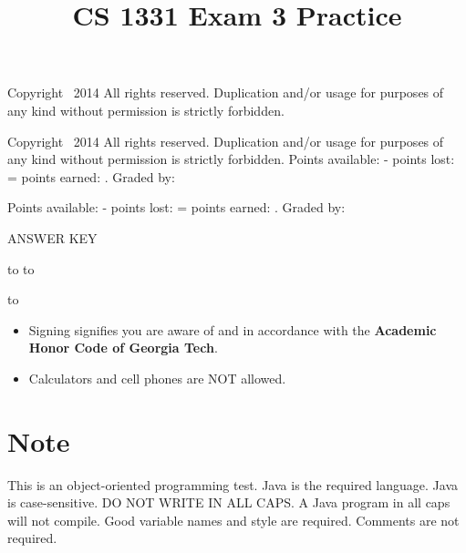 \documentclass[answers,addpoints,9pt]{exam}
\title{CS 1331 Exam 3 Practice}
\date{}
\begin{document}
\maketitle
\thispagestyle{head}
\firstpageheader{}
              {\tiny Copyright \textcopyright\ 2014 All rights reserved. Duplication and/or usage for purposes of any kind without permission is strictly forbidden.}
              {}

\runningheader{}
              {\tiny Copyright \textcopyright\ 2014 All rights reserved. Duplication and/or usage for purposes of any kind without permission is strictly forbidden.}
              {}
              {}
              {Points available: \pointsonpage{ \thepage} -
               points lost: \makebox[.5in]{\hrulefill} =
               points earned:  \makebox[.5in]{\hrulefill}.
              Graded by: \makebox[.75in]{\hrulefill}}

              {}
              {Points available: \pointsonpage{ \thepage} -
               points lost: \makebox[.5in]{\hrulefill} =
               points earned:  \makebox[.5in]{\hrulefill}.
              Graded by: \makebox[.75in]{\hrulefill}}

\ifprintanswers
\begin{center}
{\LARGE ANSWER KEY}
\end{center}
\else
\vspace{0.1in}
\hbox to \textwidth{Name (print clearly): \enspace\hrulefill}
\vspace{0.3in}
\hbox to \textwidth{Signature: \hrulefill}

\vspace{0.3in}
\hbox to \textwidth{GT account username (gtg, gth, msmith3, etc): \enspace\hrulefill}

\fi

\vfill

\begin{itemize}
\item Signing signifies you are aware of and in accordance with the {\bf Academic Honor Code of Georgia Tech}.
\item Calculators and cell phones are NOT allowed.
\end{itemize}

\section*{Note} This is an object-oriented programming test.  Java is the required language.  Java is case-sensitive.  DO NOT WRITE IN ALL CAPS.  A Java program in all caps will not compile.  Good variable names and style are required.  Comments are not required.
\end{document}
